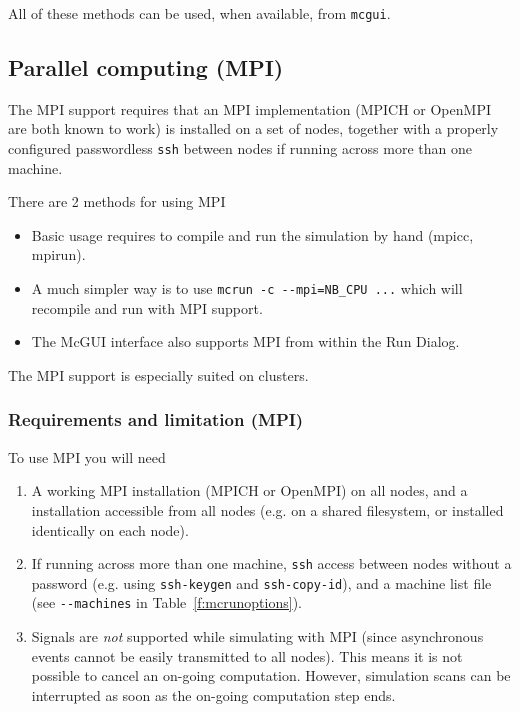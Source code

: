 All of these methods can be used, when available, from \texttt{mcgui}.

\subsection{Parallel computing (MPI)}

\label{s:mpi}
The MPI support requires that an MPI implementation (MPICH or OpenMPI are
both known to work) is installed on a set of nodes, together with a
properly configured passwordless \texttt{ssh} between nodes if running
across more than one machine.

There are 2 methods for using MPI
\begin{itemize}
\item Basic usage requires to compile and run the simulation by hand (mpicc, mpirun).
\item A much simpler way is to use \verb+mcrun -c --mpi=NB_CPU ...+ which will
  recompile and run with MPI support.
\item The McGUI interface also supports MPI from within the Run Dialog.
\end{itemize}

The MPI support is especially suited on clusters.

\subsubsection{Requirements and limitation (MPI)}

To use MPI you will need
  \begin{enumerate}
  \item{A working MPI installation (MPICH or OpenMPI) on all nodes, and a \MCS
      installation accessible from all nodes (e.g. on a shared filesystem, or
      installed identically on each node).}
  \item{If running across more than one machine, \texttt{ssh} access between
      nodes without a password (e.g. using \texttt{ssh-keygen} and
      \texttt{ssh-copy-id}), and a machine list file (see \verb+--machines+ in
      Table~\ref{f:mcrunoptions}).}
  \item Signals are \emph{not} supported while simulating with MPI (since
    asynchronous events cannot be easily transmitted to all nodes). This
    means it is not possible to cancel an on-going computation. However,
    simulation scans can be interrupted as soon as the on-going computation
    step ends.
  \end{enumerate}

